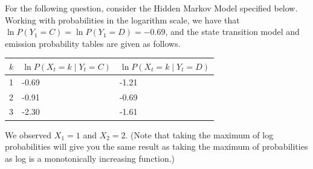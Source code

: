 \documentclass[11pt,addpoints,answers]{exam}
\begin{document}
\begin{questions}
\clearpage

For the following question, consider the Hidden Markov Model specified below. Working with probabilities in the logarithm scale, we have that $\ln{P(Y_1=C)} = \ln{P(Y_1=D)} = -0.69$, and the state transition model and emission probability tables are given as follows.

\begin{center}
\end{center}
\begin{table}[h!]
\centering
\begin{tabular}{|l|l|l|}
\hline
\multicolumn{1}{|c|}{$k$} & \multicolumn{1}{c|}{$\ln{P(X_t=k\mid Y_t=C)}$} & $\ln{P(X_t=k \mid Y_t=D)}$ \\ \hline
1                           & -0.69                           & -1.21      \\ \hline
2                           & -0.91                           & -0.69         \\ \hline
3                           & -2.30                           & -1.61      \\ \hline
\end{tabular}
\end{table}

 We observed $X_1 = 1$ and $X_2 = 2$. (Note that taking the maximum of log probabilities will give you the same result as taking the maximum of probabilities as log is a monotonically increasing function.)

    
\end{questions}
\end{document}
